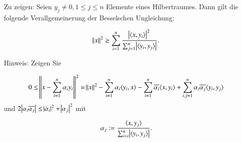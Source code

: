 
\begin{exercise}
  Zu zeigen: Seien $y_j \neq 0, 1 \leq j \leq n$ Elemente eines Hilbertraumes. Dann gilt die folgende Verallgemeinerung der Besselschen Ungleichung:

  \begin{equation*}
    \norm{x}^2 \geq \sum_{i=1}^n{\frac{\abs{\langle {x},{y_i} \rangle}^2}{\sum_{j=1}^n{\abs{\langle {y_i},{y_j} \rangle}}}}.
  \end{equation*}

  Hinweis: Zeigen Sie

  \begin{equation*}
    0 \leq \norm{x - \sum_{i=1}^n{\alpha_i y_i}}^2
    = \norm{x}^2 - \sum_{i=1}^n{\alpha_i\langle {y_i},{x} \rangle} - \sum_{i=1}^n{\overline{\alpha_i}\langle {x},{y_i} \rangle} + \sum_{i,j=1}^n{\alpha_i\overline{\alpha_j}\langle {y_i},{y_j} \rangle}
  \end{equation*}
  und $2\abs{\alpha_i\overline{\alpha_j}}\leq \abs{\alpha_i}^2 + \abs{\alpha_j}^2$ mit

  \begin{equation*}
    \alpha_j:=\frac{\langle {x},{y_j} \rangle}{\sum_{i=i}^n{\abs{\langle {y_i},{y_j} \rangle}}}.
  \end{equation*}
\end{exercise}

